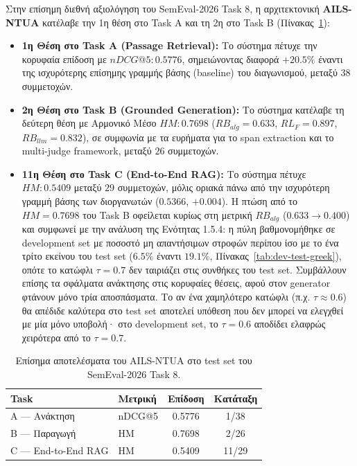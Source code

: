 Στην επίσημη διεθνή αξιολόγηση του SemEval-2026 Task 8, η αρχιτεκτονική \textbf{AILS-NTUA} κατέλαβε την 1η θέση στο Task A και τη 2η στο Task B (Πίνακας~\ref{tab:leaderboard-greek}):
\begin{itemize}
    \item \textbf{1η Θέση στο Task A (Passage Retrieval):} Το σύστημα πέτυχε την κορυφαία επίδοση με \textbf{$nDCG@5: 0.5776$}, σημειώνοντας διαφορά \textbf{$+20.5\%$} έναντι της ισχυρότερης επίσημης γραμμής βάσης (baseline) του διαγωνισμού, μεταξύ $38$ συμμετοχών.
    \item \textbf{2η Θέση στο Task B (Grounded Generation):} Το σύστημα κατέλαβε τη δεύτερη θέση με Αρμονικό Μέσο \textbf{$HM: 0.7698$} ($RB_{alg}{=}0.633$, $RL_F{=}0.897$, $RB_{llm}{=}0.832$), σε συμφωνία με τα ευρήματα για το span extraction και το multi-judge framework, μεταξύ $26$ συμμετοχών.
    \item \textbf{11η Θέση στο Task C (End-to-End RAG):} Το σύστημα πέτυχε $HM: 0.5409$ μεταξύ $29$ συμμετοχών, μόλις οριακά πάνω από την ισχυρότερη γραμμή βάσης των διοργανωτών ($0.5366$, $+0.004$). Η πτώση από το $HM{=}0.7698$ του Task B οφείλεται κυρίως στη μετρική $RB_{alg}$ ($0.633 \rightarrow 0.400$) και συμφωνεί με την ανάλυση της Ενότητας 1.5.4: η πύλη βαθμονομήθηκε σε development set με ποσοστό μη απαντήσιμων στροφών περίπου ίσο με το ένα τρίτο εκείνου του test set ($6.5\%$ έναντι $19.1\%$, Πίνακας~\ref{tab:dev-test-greek}), οπότε το κατώφλι $\tau{=}0.7$ δεν ταιριάζει στις συνθήκες του test set. Συμβάλλουν επίσης τα σφάλματα ανάκτησης στις κορυφαίες θέσεις, αφού στον generator φτάνουν μόνο τρία αποσπάσματα. Το αν ένα χαμηλότερο κατώφλι (π.χ. $\tau \approx 0.6$) θα απέδιδε καλύτερα στο test set αποτελεί υπόθεση που δεν μπορεί να ελεγχθεί με μία μόνο υποβολή· στο development set, το $\tau{=}0.6$ αποδίδει ελαφρώς χειρότερα από το $\tau{=}0.7$.
\end{itemize}

\begin{table}[ht]
\centering
\small
\begin{tabular}{llcc}
\toprule
\textbf{Task} & \textbf{Μετρική} & \textbf{Επίδοση} & \textbf{Κατάταξη} \\
\midrule
A — Ανάκτηση & nDCG@5 & 0.5776 & 1/38 \\
B — Παραγωγή & HM & 0.7698 & 2/26 \\
C — End-to-End RAG & HM & 0.5409 & 11/29 \\
\bottomrule
\end{tabular}
\caption{Επίσημα αποτελέσματα του AILS-NTUA στο test set του SemEval-2026 Task 8.}
\label{tab:leaderboard-greek}
\end{table}